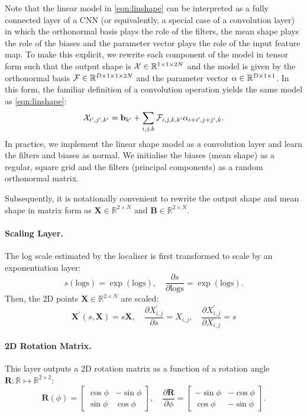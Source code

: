 \documentclass[runningheads]{llncs}
\newcommand{\R}{\mathbb{R}}
\newcommand{\logs}{\textrm{logs}}
\begin{document}
Note that the linear model in \eqref{eqn:linshape} can be interpreted as a fully connected layer of a CNN (or equivalently, a special case of a convolution layer) in which the orthonormal basis plays the role of the filters, the mean shape plays the role of the biases and the parameter vector plays the role of the input feature map. To make this explicit, we rewrite each component of the model in tensor form such that the output shape is ${\cal X}\in\R^{1\times 1\times 2N}$ and the model is given by the orthonormal basis ${\cal F}\in\R^{D\times 1\times 1\times 2N}$ and the parameter vector ${\cal \alpha}\in\R^{D\times 1 \times 1}$. In this form, the familiar definition of a convolution operation yields the same model as \eqref{eqn:linshape}:
\begin{equation}{\cal X}_{i^{\prime},j^{\prime},k^{\prime}}=\mathbf{b}_{k^{\prime}} + \sum_{i,j,k} {\cal F}_{i,j,k,k^{\prime}}\alpha_{i+i^{\prime},j+j^{\prime},k}.
\end{equation}
In practice, we implement the linear shape model as a convolution layer and learn the filters and biases as normal. We initialise the biases (mean shape) as a regular, square grid and the filters (principal components) as a random orthonormal matrix.

Subsequently, it is notationally convenient to rewrite the output shape and mean shape in matrix form as $\mathbf{X}\in\R^{2\times N}$ and  $\mathbf{B}\in\R^{2\times N}$.

\paragraph{Scaling Layer.}

The log scale estimated by the localiser is first transformed to scale by an exponentiation layer:
\begin{equation*}
    s(\logs)=\exp(\logs),\quad \frac{\partial s}{\partial \logs}=\exp(\logs).
\end{equation*}
Then, the 2D points $\mathbf{X}\in\R^{2\times N}$ are scaled:
\begin{equation*}
    \mathbf{X}^{\prime}(s,\mathbf{X})=s\mathbf{X},\quad \frac{\partial X^{\prime}_{i,j}}{\partial s}=X_{i,j},\quad \frac{\partial X^{\prime}_{i,j}}{\partial X_{i,j}}=s
\end{equation*}

\paragraph{2D Rotation Matrix.}
This layer outputs a 2D rotation matrix as a function of a rotation angle $\mathbf{R}:\R\mapsto\R^{2\times 2}$:
\begin{equation}
    \mathbf{R}(\phi) = \begin{bmatrix}\cos\phi & -\sin\phi \\ \sin\phi & \cos\phi \end{bmatrix},\quad
    \frac{\partial \mathbf{R}}{\partial \phi} = \begin{bmatrix}-\sin\phi & -\cos\phi \\ \cos\phi & -\sin\phi \end{bmatrix}.
\end{equation}
\end{document}
